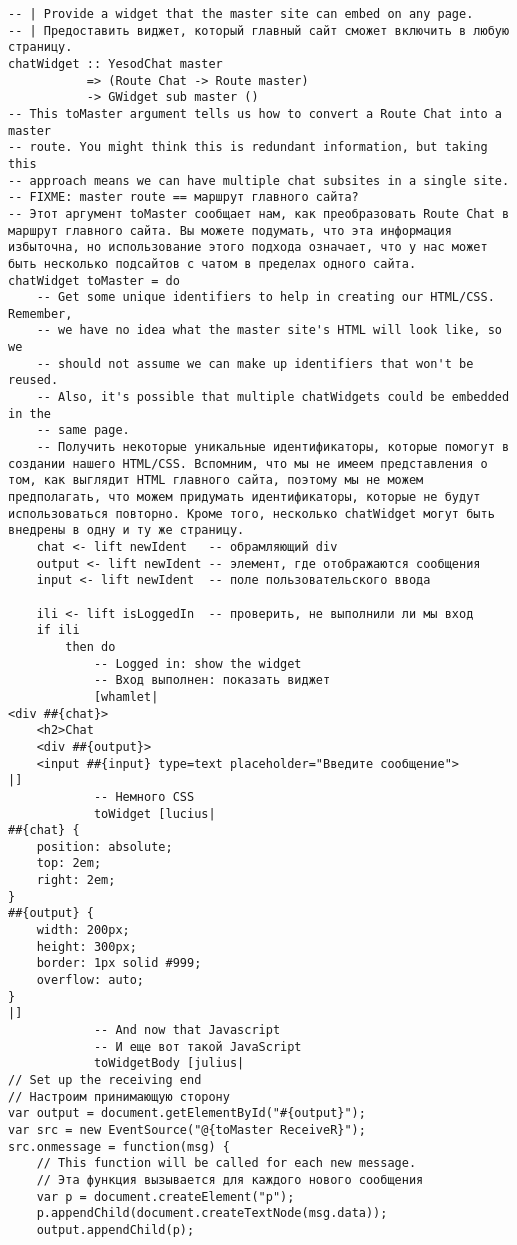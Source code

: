\begin{lstlisting}
-- | Provide a widget that the master site can embed on any page.
-- | Предоставить виджет, который главный сайт сможет включить в любую страницу.
chatWidget :: YesodChat master
           => (Route Chat -> Route master)
           -> GWidget sub master ()
-- This toMaster argument tells us how to convert a Route Chat into a master
-- route. You might think this is redundant information, but taking this
-- approach means we can have multiple chat subsites in a single site.
-- FIXME: master route == маршрут главного сайта?
-- Этот аргумент toMaster сообщает нам, как преобразовать Route Chat в маршрут главного сайта. Вы можете подумать, что эта информация избыточна, но использование этого подхода означает, что у нас может быть несколько подсайтов с чатом в пределах одного сайта.
chatWidget toMaster = do
    -- Get some unique identifiers to help in creating our HTML/CSS. Remember,
    -- we have no idea what the master site's HTML will look like, so we
    -- should not assume we can make up identifiers that won't be reused.
    -- Also, it's possible that multiple chatWidgets could be embedded in the
    -- same page.
    -- Получить некоторые уникальные идентификаторы, которые помогут в создании нашего HTML/CSS. Вспомним, что мы не имеем представления о том, как выглядит HTML главного сайта, поэтому мы не можем предполагать, что можем придумать идентификаторы, которые не будут использоваться повторно. Кроме того, несколько chatWidget могут быть внедрены в одну и ту же страницу.
    chat <- lift newIdent   -- обрамляющий div
    output <- lift newIdent -- элемент, где отображаются сообщения
    input <- lift newIdent  -- поле пользовательского ввода

    ili <- lift isLoggedIn  -- проверить, не выполнили ли мы вход
    if ili
        then do
            -- Logged in: show the widget
            -- Вход выполнен: показать виджет
            [whamlet|
<div ##{chat}>
    <h2>Chat
    <div ##{output}>
    <input ##{input} type=text placeholder="Введите сообщение">
|]
            -- Немного CSS
            toWidget [lucius|
##{chat} {
    position: absolute;
    top: 2em;
    right: 2em;
}
##{output} {
    width: 200px;
    height: 300px;
    border: 1px solid #999;
    overflow: auto;
}
|]
            -- And now that Javascript
            -- И еще вот такой JavaScript
            toWidgetBody [julius|
// Set up the receiving end
// Настроим принимающую сторону
var output = document.getElementById("#{output}");
var src = new EventSource("@{toMaster ReceiveR}");
src.onmessage = function(msg) {
    // This function will be called for each new message.
    // Эта функция вызывается для каждого нового сообщения
    var p = document.createElement("p");
    p.appendChild(document.createTextNode(msg.data));
    output.appendChild(p);


\end{lstlisting}
